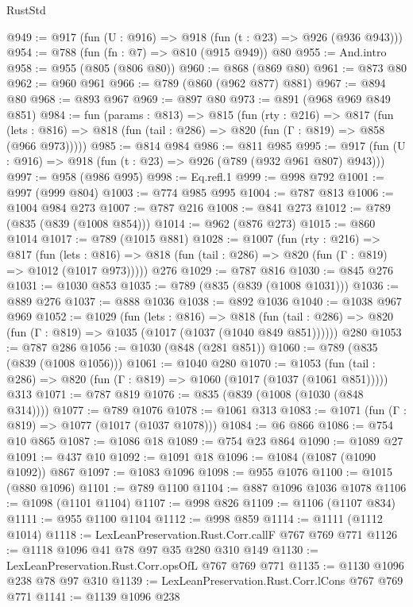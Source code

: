 \begin{lexlean}{RustStd}
\begin{coremodule}
{\begin{coremodule}
{{{{{{{@949 := @917 (fun (U : @916) => @918 (fun (t : @23) => @926 (@936 @943)))
@954 := @788 (fun (fn : @7) => @810 (@915 @949)) @80
@955 := And.intro
@958 := @955 (@805 (@806 @80))
@960 := @868 (@869 @80)
@961 := @873 @80
@962 := @960 @961
@966 := @789 (@860 (@962 @877) @881)
@967 := @894 @80
@968 := @893 @967
@969 := @897 @80
@973 := @891 (@968 @969 @849 @851)
@984 := fun (params : @813) =>
  @815
    (fun (rty : @216) =>
    @817
      (fun (lets : @816) => @818 (fun (tail : @286) => @820 (fun (Γ : @819) => @858 (@966 @973)))))
@985 := @814 @984
@986 := @811 @985
@995 := @917 (fun (U : @916) => @918 (fun (t : @23) => @926 (@789 (@932 @961 @807) @943)))
@997 := @958 (@986 @995)
@998 := Eq.refl.{1}
@999 := @998 @792
@1001 := @997 (@999 @804)
@1003 := @774 @985 @995
@1004 := @787 @813
@1006 := @1004 @984 @273
@1007 := @787 @216
@1008 := @841 @273
@1012 := @789 (@835 (@839 (@1008 @854)))
@1014 := @962 (@876 @273)
@1015 := @860 @1014
@1017 := @789 (@1015 @881)
@1028 := @1007
    (fun (rty : @216) =>
    @817
      (fun (lets : @816) =>
      @818 (fun (tail : @286) => @820 (fun (Γ : @819) => @1012 (@1017 @973)))))
    @276
@1029 := @787 @816
@1030 := @845 @276
@1031 := @1030 @853
@1035 := @789 (@835 (@839 (@1008 @1031)))
@1036 := @889 @276
@1037 := @888 @1036
@1038 := @892 @1036
@1040 := @1038 @967 @969
@1052 := @1029
    (fun (lets : @816) =>
    @818 (fun (tail : @286) => @820 (fun (Γ : @819) => @1035 (@1017 (@1037 (@1040 @849 @851))))))
    @280
@1053 := @787 @286
@1056 := @1030 (@848 (@281 @851))
@1060 := @789 (@835 (@839 (@1008 @1056)))
@1061 := @1040 @280
@1070 := @1053
    (fun (tail : @286) => @820 (fun (Γ : @819) => @1060 (@1017 (@1037 (@1061 @851)))))
    @313
@1071 := @787 @819
@1076 := @835 (@839 (@1008 (@1030 (@848 @314))))
@1077 := @789 @1076
@1078 := @1061 @313
@1083 := @1071 (fun (Γ : @819) => @1077 (@1017 (@1037 @1078)))
@1084 := @6 @866
@1086 := @754 @10 @865
@1087 := @1086 @18
@1089 := @754 @23 @864
@1090 := @1089 @27
@1091 := @437 @10
@1092 := @1091 @18
@1096 := @1084 (@1087 (@1090 @1092)) @867
@1097 := @1083 @1096
@1098 := @955 @1076
@1100 := @1015 (@880 @1096)
@1101 := @789 @1100
@1104 := @887 @1096 @1036 @1078
@1106 := @1098 (@1101 @1104)
@1107 := @998 @826
@1109 := @1106 (@1107 @834)
@1111 := @955 @1100 @1104
@1112 := @998 @859
@1114 := @1111 (@1112 @1014)
@1118 := LexLeanPreservation.Rust.Corr.callF @767 @769 @771
@1126 := @1118 @1096 @41 @78 @97 @35 @280 @310 @149
@1130 := LexLeanPreservation.Rust.Corr.opsOfL @767 @769 @771
@1135 := @1130 @1096 @238 @78 @97 @310
@1139 := LexLeanPreservation.Rust.Corr.lCons @767 @769 @771
@1141 := @1139 @1096 @238
}}}}}}}
\end{coremodule}}
\end{coremodule}
\end{lexlean}
